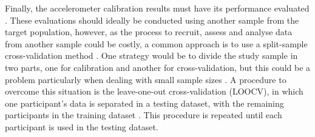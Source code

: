 \documentclass[11pt]{article}
\begin{document}
Finally, the accelerometer calibration results must have its performance evaluated \cite{Basset_2012}. These evaluations should ideally be conducted using another sample from the target population, however, as the process to recruit, assess and analyse data from another sample could be costly, a common approach is to use a split-sample cross-validation method \cite{Staudenmayer_2012}. One strategy would be to divide the study sample in two parts, one for calibration and another for cross-validation, but this could be a problem particularly when dealing with small sample sizes \cite{Staudenmayer_2012}. A procedure to overcome this situation is the leave-one-out cross-validation (LOOCV), in which one participant's data is separated in a testing dataset, with the remaining participants in the training dataset \cite{Staudenmayer_2012}. This procedure is repeated until each participant is used in the testing dataset. \\

\pagebreak



\end{document}
